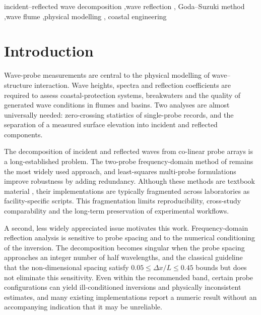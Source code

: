 \documentclass[preprint,12pt,a4paper]{elsarticle}
\begin{document}
\begin{frontmatter}
\begin{keyword}
incident--reflected wave decomposition \sep wave reflection \sep
Goda--Suzuki method \sep wave flume \sep physical modelling \sep
coastal engineering
\end{keyword}

\end{frontmatter}

\section{Introduction}
Wave-probe measurements are central to the physical modelling of
wave--structure interaction. Wave heights, spectra and reflection
coefficients are required to assess coastal-protection systems,
breakwaters and the quality of generated wave conditions in flumes and
basins. Two analyses are almost universally needed: zero-crossing
statistics of single-probe records, and the separation of a measured
surface elevation into incident and reflected components.

The decomposition of incident and reflected waves from co-linear probe
arrays is a long-established problem. The two-probe frequency-domain
method of \citet{goda1976incident} remains the most widely used
approach, and least-squares multi-probe formulations
\citep{mansard1980measurement,kobayashi1990reflection} improve
robustness by adding redundancy. Although these methods are textbook
material \citep{goda2010randomseas,dean1991waterwave,holthuijsen2007waves},
their implementations are typically fragmented across laboratories as
facility-specific scripts. This fragmentation limits reproducibility,
cross-study comparability and the long-term preservation of
experimental workflows.

A second, less widely appreciated issue motivates this work.
Frequency-domain reflection analysis is sensitive to probe spacing and
to the numerical conditioning of the inversion. The decomposition
becomes singular when the probe spacing approaches an integer number of
half wavelengths, and the classical guideline that the non-dimensional
spacing satisfy $0.05 \le \Delta x/L \le 0.45$ bounds but does not
eliminate this sensitivity. Even within the recommended band, certain
probe configurations can yield ill-conditioned inversions and
physically inconsistent estimates, and many existing implementations
report a numeric result without an accompanying indication that it may
be unreliable.
\end{document}
